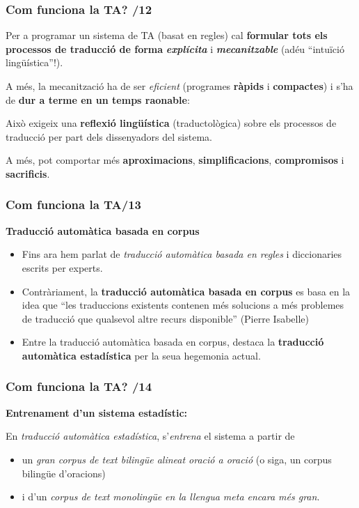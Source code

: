 \documentclass{beamer}
\newcommand{\empha}[1]{\emph{#1}\/}
\begin{document}
\begin{frame}
\frametitle{ Com funciona la TA? /12}
{
  
  { Per a programar un sistema de TA (basat en regles) cal \textbf{formular
      tots els processos de traducció de forma} \empha{\textbf{explícita}} i
    \empha{\textbf{mecanitzable}}} {(adéu ``intuïció
    lingüística''!).}
  
  {A més, la mecanització ha de ser \empha{eficient} (programes
    \textbf{ràpids} i \textbf{compactes}) i s'ha de
    \textbf{dur a terme en un temps raonable}:}
\begin{itemize}\setlength{\itemsep}{0pt}
{\item Això exigeix una \textbf{reflexió lingüística}
  (traductològica) sobre els processos de traducció per part dels
  dissenyadors del sistema.}
{\item A més, pot comportar més \textbf{aproximacions},
  \textbf{simplificacions}, \textbf{compromisos} i
  \textbf{sacrificis}.}
\end{itemize}
}
\end{frame}

\begin{frame}
 \frametitle{Com funciona la TA/13}

\textbf{Traducció automàtica basada en corpus}
 \begin{itemize}
 \item Fins ara hem parlat de \empha{traducció automàtica basada en regles} i diccionaries escrits per experts.
\item Contràriament, la \textbf{traducció automàtica basada en corpus} es basa en la idea que ``les traduccions existents contenen més solucions a més problemes de traducció que qualsevol altre recurs disponible'' (Pierre Isabelle)
\item Entre la traducció automàtica basada en corpus, destaca la
\textbf{traducció automàtica estadística} per la seua hegemonia actual.
 \end{itemize}


\end{frame}


\begin{frame}
 \frametitle{Com funciona la TA? /14}

\textbf{Entrenament d'un sistema estadístic:}

En \empha{traducció automàtica estadística}, s'\empha{entrena} el
sistema a partir de
\begin{itemize}
\item un \empha{gran corpus de text bilingüe alineat oració a
  oració}  (o siga, un corpus bilingüe d'oracions)
\item  i d'un \empha{corpus de text monolingüe en la llengua meta encara més gran}. 
\end{itemize}

\end{frame}
\end{document}
